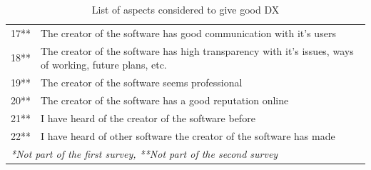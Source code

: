 \documentclass{article}
\begin{document}
\begin{table}[H]
\begin{tabularx}{\columnwidth}{l X}
\hline \hline
17** & The creator of the software has good communication with it's users \\
18** & The creator of the software has high transparency with it's issues, ways of working, future plans, etc. \\
19** & The creator of the software seems professional \\
20** & The creator of the software has a good reputation online \\
21** & I have heard of the creator of the software before \\
22** & I have heard of other software the creator of the software has made
& \\
\multicolumn{2}{l}{\textit{*Not part of the first survey, **Not part of the second survey}}
\end{tabularx}
\caption{List of aspects considered to give good DX}
\label{tab:aspects}
\end{table}
\end{document}
